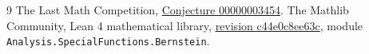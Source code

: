 \documentclass[11pt]{article}
\begin{document}
\begingroup\raggedright
\begin{thebibliography}{9}
 The Last Math Competition,
\href{https://github.com/The-Last-Math-Competition/The-Last-Math-Competition/blob/main/conjectures/00000003454.md}{Conjecture 00000003454}.
 The Mathlib Community, Lean 4 mathematical library,
\href{https://github.com/leanprover-community/mathlib4/commit/c44e0c8ee63ca166450922a373c7409c5d26b00b}{revision c44e0c8ee63c},
module \texttt{Analysis.SpecialFunctions.Bernstein}.
\end{thebibliography}
\endgroup
\end{document}
